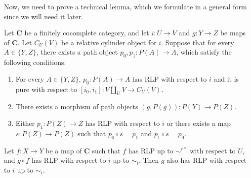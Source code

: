 \documentclass{tac}
\theoremstyle{definition}
\newcommand{\cat}[1]{\mathbf{#1}}
\newcommand{\C}{\cat{C}}
\newcommand{\cyli}{i}
\begin{document}
Now, we need to prove a technical lemma, which we formulate in a general form since we will need it later.

\begin{lem}[we-bot]
Let $\C$ be a finitely cocomplete category, and let $i : U \to V$ and $g : Y \to Z$ be maps of $\C$.
Let $C_U(V)$ be a relative cylinder object for $i$.
Suppose that for every $A \in \{ Y, Z \}$, there exists a path object $p_0,p_1 : P(A) \to A$, which satisfy the following conditions:
\begin{enumerate}
\item For every $A \in \{ Y, Z \}$, $p_0 : P(A) \to A$ has RLP with respect to $i$ and it is pure with respect to $[\cyli_0,\cyli_1] : V \amalg_U V \to C_U(V)$.
\item There exists a morphism of path objects $(g,P(g)) : P(Y) \to P(Z)$.
\item Either $p_1 : P(Z) \to Z$ has RLP with respect to $i$ or there exists a map $s : P(Z) \to P(Z)$ such that $p_0 \circ s = p_1$ and $p_1 \circ s = p_0$.
\end{enumerate}

Let $f : X \to Y$ be a map of $\C$ such that $f$ has RLP up to $\sim^{r*}$ with respect to $U$, and $g \circ f$ has RLP with respect to $i$ up to $\sim_i$.
Then $g$ also has RLP with respect to $i$ up to $\sim_i$.
\end{lem}
\end{document}
